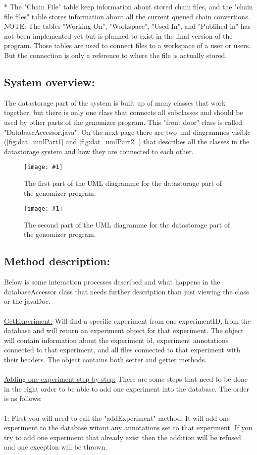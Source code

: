 \documentclass[a4paper]{report}
\newcommand{\addImage}[1]{\centering\texttt{[image: \#1]}}
\newcommand{\refer}[1]{\autoref{#1}}
\begin{document}
* The "Chain File" table keep information about stored chain files, and the "chain file files" table stores information about all the current queued chain convertions.\\
NOTE: The tables "Working On", "Workspace", "Used In", and "Publihed in" has not been implemented yet but is planned to exist in the final version of the program. Those tables are used to connect files to a workspace of a user or users. But the connection is only a reference to where the file is actually stored. 

\subsection{System overview:}
The datastorage part of the system is built up of many classes that work together, but there is only one class that connects all subclasses and should be used by other parts of the genomizer program. This "front door" class is called "DatabaseAccessor.java". On the next page there are two uml diagrammes visible (\refer{fig:dat_umlPart1} and \refer{fig:dat_umlPart2} ) that describes all the classes in the datastorage system and how they are connected to each other.
\newpage
\begin{figure}[H]
\addImage{dat_Uml3_part1.jpg}
\caption{The first part of the UML diagramme for the datastorage part of the genomizer program.}
\label{fig:dat_umlPart1}
\end{figure}

\newpage
\begin{figure}[H]
\addImage{dat_Uml3_part2.jpg}
\caption{The second part of the UML diagramme for the datastorage part of the genomizer program.}
\label{fig:dat_umlPart2}
\end{figure}
\newpage
\subsection{Method description:}
Below is some interaction processes described and what happens in the databaseAccessor class that needs further description than just viewing the class or the javaDoc.\\
\\
\underline{GetExperiment:} Will find a specific experiment from one experimentID, from the database and will return an experiment object for that experiment. The object will contain information about the experiment id, experiment annotations connected to that experiment, and all files connected to that experiment with their headers. The object contains both setter and getter methods. \\
\\
\underline{Adding one experiment step by step:}
There are some steps that need to be done in the right order to be able to add one experiment into the database. The order is as follows:\\
\\
1: First you will need to call the "addExperiment" method. It will add one experiment to the database witout any annotations set to that experiment. If you try to add one experiment that already exist then the addition will be refused and one exception will be thrown.
\end{document}
